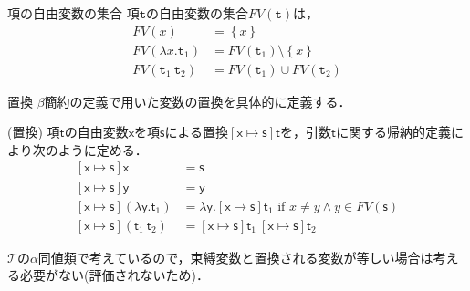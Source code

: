 \documentclass[9pt]{beamer}
\begin{document}
\begin{frame}
\begin{block}{項の自由変数の集合}
    項$\mathtt{t}$の自由変数の集合$FV(\mathtt{t})$は，
    \begin{align*}
    FV(x) &= \left\{x\right\}\\
    FV(\lambda x. \mathtt{t}_{1}) &= FV(\mathtt{t}_{1})\setminus \left\{x\right\}\\
    FV(\mathtt{t}_{1}\ \mathtt{t}_{2}) &= FV(\mathtt{t}_{1})\cup FV(\mathtt{t}_{2})
    \end{align*}
\end{block}
\end{frame}
\begin{frame}{置換}
    $\beta$簡約の定義で用いた変数の置換を具体的に定義する．
\begin{block}{(置換)}
    項$\mathsf{t}$の自由変数$\mathsf{x}$を項$\mathsf{s}$による置換$\left[\mathsf{x}\mapsto \mathsf{s}\right]\mathsf{t}$を，引数$\mathsf{t}$に関する帰納的定義により次のように定める．
    \begin{align*}
    \left[\mathsf{x}\mapsto\mathsf{s}\right]\mathsf{x} &= \mathsf{s}\\
    \left[\mathsf{x}\mapsto\mathsf{s}\right]\mathsf{y} &= \mathsf{y}\\
    \left[\mathsf{x}\mapsto \mathsf{s}\right]\left(\lambda \mathsf{y}.\mathsf{t}_{1}\right)&= 
        \lambda \mathsf{y}. \left[\mathsf{x}\mapsto\mathsf{s}\right]\mathsf{t}_{1}  \text{\ if\ }x \neq y\land y\in FV(\mathsf{s})\\
        \left[\mathsf{x}\mapsto \mathsf{s}\right]\left(\mathsf{t}_{1}\ \mathsf{t}_{2}\right) &= \left[\mathsf{x}\mapsto \mathsf{s}\right]\mathsf{t}_{1}\ \left[\mathsf{x}\mapsto \mathsf{s}\right]\mathsf{t}_{2}
    \end{align*}
\end{block}
$\mathcal{T}$の$\alpha$同値類で考えているので，束縛変数と置換される変数が等しい場合は考える必要がない(評価されないため)．
\end{frame}
\end{document}
